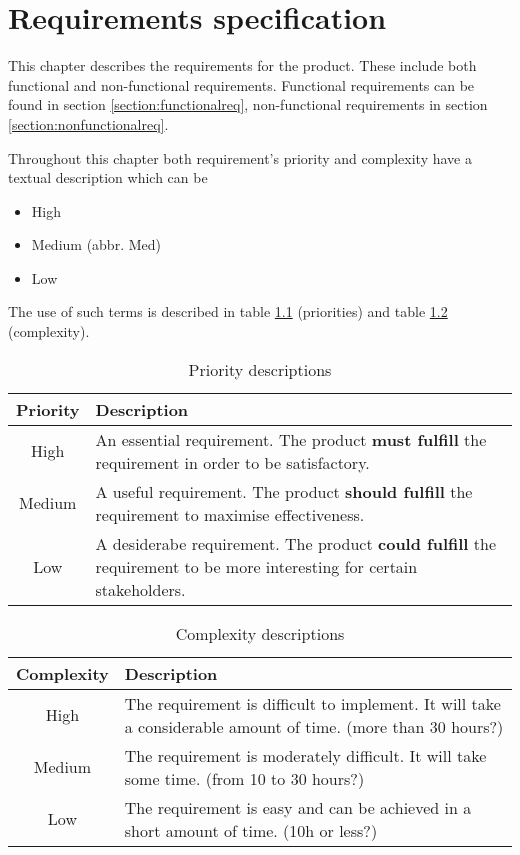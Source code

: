 \chapter{Requirements specification}

\label{ch:requirements}

This chapter describes the requirements for the product. These include both functional and non-functional requirements.
Functional requirements can be found in section \ref{section:functionalreq},
non-functional requirements in section \ref{section:nonfunctionalreq}.

Throughout this chapter both requirement's priority and complexity have a textual description which can be
\begin{itemize}
\item High
\item Medium (abbr. Med)
\item Low
\end{itemize}

The use of such terms is described in table \ref{table:priorities} (priorities) and table \ref{table:complexity} (complexity).

\begin{table}[h]
\begin{center}
\begin{tabular}{ | c | p{12.5cm} | }
  \hline
  Priority & Description \\
  \hline\noalign{\smallskip}\noalign{\smallskip}\hline
  High & An essential requirement. The product \textbf{must fulfill} the requirement in order to be satisfactory. \\
  Medium & A useful requirement. The product \textbf{should fulfill} the requirement to maximise effectiveness. \\
  Low & A desiderabe requirement. The product \textbf{could fulfill} the requirement to be more interesting for certain stakeholders. \\
  \hline
\end{tabular}
\end{center}
\caption{Priority descriptions}
\label{table:priorities}
\end{table}

\begin{table}[h]
\begin{center}
\begin{tabular}{ | c | p{12.5cm} | }
  \hline
  Complexity & Description \\
  \hline\noalign{\smallskip}\noalign{\smallskip}\hline
  High & The requirement is difficult to implement. It will take a considerable amount of time. (more than 30 hours?) \\
  Medium & The requirement is moderately difficult. It will take some time. (from 10 to 30 hours?) \\
  Low & The requirement is easy and can be achieved in a short amount of time. (10h or less?) \\
  \hline
\end{tabular}
\end{center}
\caption{Complexity descriptions}
\label{table:complexity}
\end{table}

